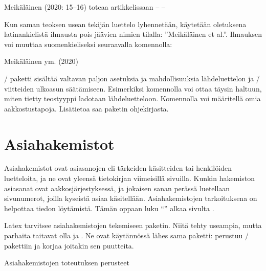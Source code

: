 \begin{tulossis}
  Meikäläinen (2020: 15--16) toteaa artikkelissaan -- --
\end{tulossis}

\noindent
Kun saman teoksen usean tekijän luettelo lyhennetään, käytetään
oletuksena latinankielistä ilmausta pois jäävien nimien tilalla:
''Meikäläinen et al.''. Ilmauksen voi muuttaa suomenkieliseksi
seuraavalla komennolla:

\begin{koodilohkosis}
\end{koodilohkosis}

\begin{tulossis}
  Meikäläinen ym. (2020)
\end{tulossis}

\noindent
{}\-/ paketti sisältää valtavan paljon asetuksia ja
mahdollisuuksia lähdeluettelon ja \=/viitteiden ulkoasun säätämiseen.
Esimerkiksi komennolla  voi ottaa
täysin haltuun, miten tietty teostyyppi ladotaan lähdeluetteloon.
Komennolla  voi määritellä omia
aakkostustapoja. Lisätietoa saa paketin ohjekirjasta.

\section{Asiahakemistot}
\label{luku/asiasanat}

Asiahakemistot ovat asiasanojen eli tärkeiden käsitteiden tai
henkilöiden luetteloita, ja ne ovat yleensä tietokirjan viimeisillä
sivuilla. Kunkin hakemiston asiasanat ovat aakkosjärjestyksessä, ja
jokaisen sanan perässä luetellaan sivunumerot, joilla kyseistä asiaa
käsitellään. Asiahakemistojen tarkoituksena on helpottaa tiedon
löytämistä. Tämän oppaan luku \enquote{}
alkaa sivulta \pageref{luku/asiahakemisto}.

Latex tarvitsee asiahakemistojen tekemiseen paketin. Niitä tehty
useampia, mutta parhaita taitavat olla  ja
. Ne ovat käytännössä lähes sama paketti:
 perustuu \-/ pakettiin ja korjaa
joitakin sen puutteita.

\begin{esimerkki*}

  \caption{Asiahakemistojen toteutuksen perusteet}
  \label{esim/asiasanat-perus}
\end{esimerkki*}


